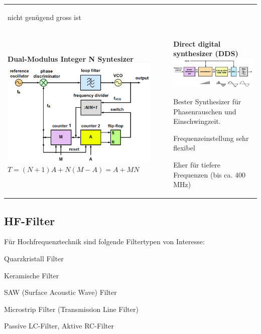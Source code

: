 \begin{tabular}{ll}
{\begin{liste}
        nicht genügend gross ist
    \end{liste}
    } \\
\parbox{9cm}{
    \textbf{Dual-Modulus Integer N Syntesizer}\\
    \includegraphics[width=7.5cm]{./bilder/components_pll_dual-modulus-integerNsynthesizer.png} \\
    $ T=(N+1)A+N(M-A) = A + MN $
    }
& \parbox{9cm}{
	\textbf{Direct digital synthesizer (DDS)} \\
	\includegraphics[width=7.5cm]{./bilder/components_pll_dds.png}\\
    \begin{liste}
      \item Bester Synthesizer für Phasenrauschen und Einschwingzeit.
      \item Frequenzeinstellung sehr flexibel
      \item Eher für tiefere Frequenzen (bis ca. 400 MHz)
    \end{liste}
	}
    \\
\end{tabular}

	

    
\subsection{HF-Filter }
Für Hochfrequenztechnik sind folgende Filtertypen von Interesse: 
\begin{liste}
	\item Quarzkristall Filter
	\item Keramische Filter
	\item SAW (Surface Acoustic Wave) Filter
	\item Microstrip Filter (Transmission Line Filter)
	\item Passive LC-Filter, Aktive RC-Filter
\end{liste}

